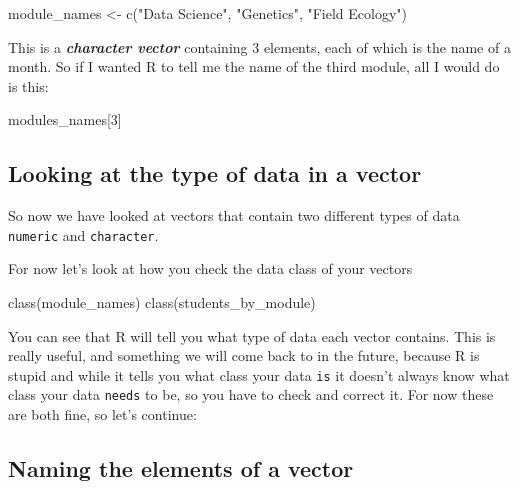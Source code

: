 \documentclass[
]{book}
\newenvironment{Shaded}{\begin{snugshade}}{\end{snugshade}}
\newcommand{\DecValTok}[1]{\textcolor[rgb]{0.00,0.00,0.81}{#1}}
\newcommand{\FunctionTok}[1]{\textcolor[rgb]{0.00,0.00,0.00}{#1}}
\newcommand{\NormalTok}[1]{#1}
\newcommand{\OtherTok}[1]{\textcolor[rgb]{0.56,0.35,0.01}{#1}}
\newcommand{\StringTok}[1]{\textcolor[rgb]{0.31,0.60,0.02}{#1}}
\begin{document}
\begin{Shaded}
\begin{Highlighting}[]
\NormalTok{module\_names }\OtherTok{\textless{}{-}} \FunctionTok{c}\NormalTok{(}\StringTok{"Data Science"}\NormalTok{, }\StringTok{"Genetics"}\NormalTok{, }\StringTok{"Field Ecology"}\NormalTok{)}
\end{Highlighting}
\end{Shaded}

This is a \textbf{\emph{character vector}} containing 3 elements, each of which is the name of a month. So if I wanted R to tell me the name of the third module, all I would do is this:

\begin{Shaded}
\begin{Highlighting}[]
\NormalTok{modules\_names[}\DecValTok{3}\NormalTok{]}
\end{Highlighting}
\end{Shaded}

\hypertarget{looking-at-the-type-of-data-in-a-vector}{%
\subsection{Looking at the type of data in a vector}\label{looking-at-the-type-of-data-in-a-vector}}

So now we have looked at vectors that contain two different types of data \texttt{numeric} and \texttt{character}.

For now let's look at how you check the data class of your vectors

\begin{Shaded}
\begin{Highlighting}[]
\FunctionTok{class}\NormalTok{(module\_names)}
\FunctionTok{class}\NormalTok{(students\_by\_module)}
\end{Highlighting}
\end{Shaded}

You can see that R will tell you what type of data each vector contains. This is really useful, and something we will come back to in the future, because R is stupid and while it tells you what class your data \texttt{is} it doesn't always know what class your data \texttt{needs} to be, so you have to check and correct it. For now these are both fine, so let's continue:

\hypertarget{naming-the-elements-of-a-vector}{%
\subsection{Naming the elements of a vector}\label{naming-the-elements-of-a-vector}}
\end{document}
